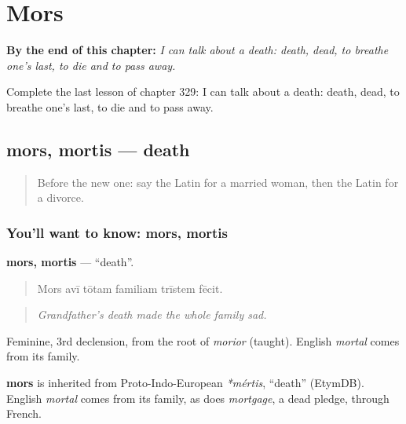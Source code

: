 
\chapter{Mors}
\label{ch:la-mors}

\begin{chapteropening}
\textbf{By the end of this chapter:} \emph{I can talk about a death: death, dead, to breathe one's last, to die and to pass away.}

Complete the last lesson of chapter 329: I can talk about a death: death, dead, to breathe one's last, to die and to pass away.
\end{chapteropening}

\section[mors, mortis]{mors, mortis — death}

\label{lesson:LA-C329-mors}



\begin{quote}
Before the new one: say the Latin for a married woman, then the Latin for a divorce.
\end{quote}

\subsection*{You'll want to know: mors, mortis}
\textbf{mors, mortis} — \textquotedblleft{}death\textquotedblright{}.

\begin{quote}
Mors avī tōtam familiam trīstem fēcit.
\end{quote}

\begin{quote}
\emph{Grandfather's death made the whole family sad.}
\end{quote}

Feminine, 3rd declension, from the root of \emph{morior} (taught). English \emph{mortal} comes from its family.

\begin{cousinweb}
\textbf{mors} is inherited from Proto-Indo-European \emph{*mértis}, \textquotedblleft{}death\textquotedblright{} (EtymDB). English \emph{mortal} comes from its family, as does \emph{mortgage}, a dead pledge, through French.
\end{cousinweb}

